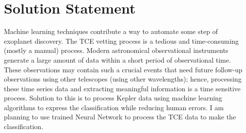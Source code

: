 \chapter{Solution Statement}


Machine learning techniques contribute a way to automate some step of exoplanet discovery. The TCE vetting process is a tedious and time-consuming (mostly a manual) process. Modern astronomical observational instruments generate a large amount of data within a short period of observational time. These observations may contain such a crucial events that need future follow-up observations using other telescopes (using other wavelengths); hence, processing these time series data and extracting meaningful information is a time sensitive process. Solution to this is to process Kepler data using machine learning algorithms to express the classification while reducing human errors. I am planning to use trained Neural Network to process the TCE data to make the classification. 